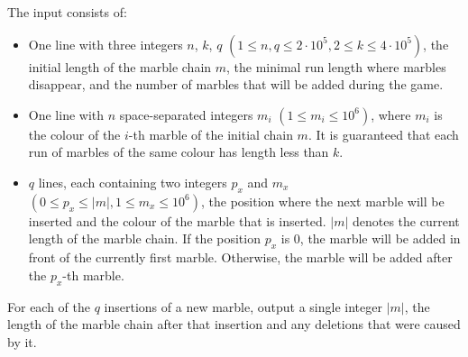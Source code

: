 \begin{Input}
The input consists of:
\begin{itemize}
	\item One line with three integers $n$, $k$, $q$ $(1\leq n,q\leq2\cdot10^5, 2\leq k\leq4\cdot10^5)$, the initial length of the marble chain $m$, the minimal run length where marbles disappear, and the number of marbles that will be added during the game.
	\item One line with $n$ space-separated integers $m_i$ $(1\leq m_i\leq10^6)$, where $m_i$ is the colour of the $i$-th marble of the initial chain $m$.
	It is guaranteed that each run of marbles of the same colour has length less than $k$.
	\item $q$ lines, each containing two integers $p_x$ and $m_x$ $(0\leq p_x \leq |m|, 1\leq m_x\leq10^6)$, the position where the next marble will be inserted and the colour of the marble that is inserted.
	$|m|$ denotes the current length of the marble chain.
	If the position $p_x$ is $0$, the marble will be added in front of the currently first marble. Otherwise, the marble will be added after the $p_x$-th marble.
\end{itemize}
\end{Input}
\begin{Output}
For each of the $q$ insertions of a new marble, output a single integer $|m|$, the length of the marble chain after that insertion and any deletions that were caused by it.
\end{Output}
